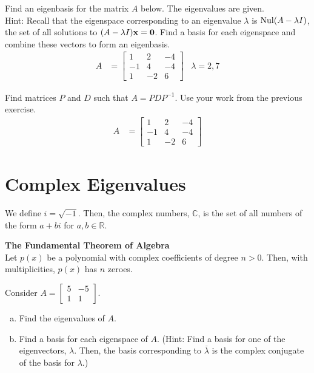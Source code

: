 \begin{exercise} %
	Find an eigenbasis for the matrix $A$ below. The eigenvalues are given. \\
	Hint: Recall that the eigenspace corresponding to an eigenvalue $\lambda$ is $\operatorname{Nul}(A-\lambda I)$, the set of all solutions to $(A-\lambda I)\boldsymbol{\mathbf{x}}=\boldsymbol{\mathbf{0}}$. Find a basis for each eigenspace and combine these vectors to form an eigenbasis.
	\begin{align*}
	A &= \begin{bmatrix}1&2&-4\\-1&4&-4\\1&-2&6\end{bmatrix} & \lambda = 2,7
	\end{align*}
\end{exercise}
\vfill


\begin{exercise} %
	Find matrices $P$ and $D$ such that $A=PDP^{-1}$. Use your work from the previous exercise.
	\begin{align*}
	A &= \begin{bmatrix}1&2&-4\\-1&4&-4\\1&-2&6\end{bmatrix}
	\end{align*}
\end{exercise}
\vspace{1.5in}


\newpage

\setcounter{section}{4}

\section{Complex Eigenvalues}
\name

\begin{boxdef}
	We define $i = \sqrt{-1}$. Then, the complex numbers, $\mathbb{C}$, is the set of all numbers of the form $a+bi$ for $a, b \in \mathbb{R}$.
\end{boxdef}

\begin{boxthm}
	\textbf{The Fundamental Theorem of Algebra} \\
	Let $p(x)$ be a polynomial with complex coefficients of degree $n>0$. Then, with multiplicities, $p(x)$ has $n$ zeroes.
\end{boxthm}

\begin{exercise} %
	Consider $A  = \begin{bmatrix}5&-5\\1&1 \end{bmatrix}.$
	\begin{enumerate}[(a)]
		\item Find the eigenvalues of $A$.
		\vfill
		\item Find a basis for each eigenspace of $A$. (Hint: Find a basis for one of the eigenvectors, $\lambda$. Then, the basis corresponding to $\overline{\lambda}$ is the complex conjugate of the basis for $\lambda$.)
		\vfill
		\vfill
	\end{enumerate}
\end{exercise}

